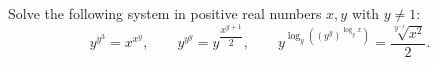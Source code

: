 Solve the following system in positive real numbers $x,y$ with $y\ne1$:
\[
y^{y^3}=x^{x^y},\qquad y^{y^y}=y^{\dfrac{x^{y+1}}{2}},\qquad y^{\log_y\left(\left(y^y\right)^{\log_y x}\right)}=\dfrac{\sqrt[y^{-1}]{x^2}}{2}.
\]
